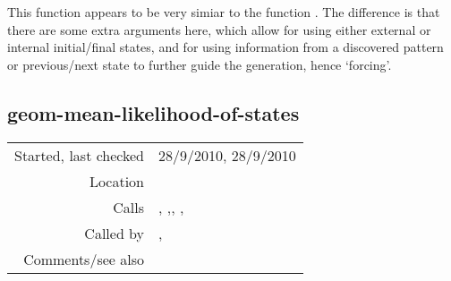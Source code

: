 \noindent This function appears to be very simiar to
the function . The
difference is that there are some extra arguments
here, which allow for using either external or
internal initial/final states, and for using
information from a discovered pattern or previous/next
state to further guide the generation, hence
`forcing'.


\subsection*{geom-mean-likelihood-of-states}\label{fun:geom-mean-likelihood-of-states}

\vspace{0.3cm}
\begin{tabular}{r|p{8cm}}
Started, last checked & 28/9/2010, 28/9/2010 \\
Location & \nameref{sec:generating-beat-MNN-spacing-forwards} \\
Calls & \nameref{fun:geom-mean-likelihood-of-subset}, \nameref{fun:max-item},\newline \nameref{fun:min-item}, \nameref{fun:nth-list-of-lists},\newline \nameref{fun:orthogonal-projection-not-unique-equalp} \\
Called by & \nameref{fun:generate-beat-MNN-spacing->},\newline \nameref{fun:generate-beat-spacing-forcing->} \\
Comments/see also & 
\end{tabular}

